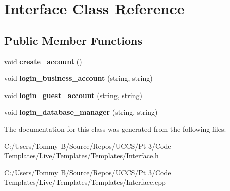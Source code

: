 \hypertarget{class_interface}{}\section{Interface Class Reference}
\label{class_interface}
\subsection*{Public Member Functions}
\begin{DoxyCompactItemize}
\item 
\mbox{\label{class_interface_a4a6e24b6aa69b78733482b6941086d48}} 
void {\bfseries create\+\_\+account} ()
\item 
\mbox{\label{class_interface_a334a8365e5a014f826d4c2209f9e0a39}} 
void {\bfseries login\+\_\+business\+\_\+account} (string, string)
\item 
\mbox{\label{class_interface_a8f8b4b24d3b401cad7272335dde706a4}} 
void {\bfseries login\+\_\+guest\+\_\+account} (string, string)
\item 
\mbox{\label{class_interface_ac9884793ae489dc87a9ddb5d7c0752f4}} 
void {\bfseries login\+\_\+database\+\_\+manager} (string, string)
\end{DoxyCompactItemize}


The documentation for this class was generated from the following files\+:\begin{DoxyCompactItemize}
\item 
C\+:/\+Users/\+Tommy B/\+Source/\+Repos/\+U\+C\+C\+S/\+Pt 3/\+Code Templates/\+Live/\+Templates/\+Templates/Interface.\+h\item 
C\+:/\+Users/\+Tommy B/\+Source/\+Repos/\+U\+C\+C\+S/\+Pt 3/\+Code Templates/\+Live/\+Templates/\+Templates/Interface.\+cpp\end{DoxyCompactItemize}
